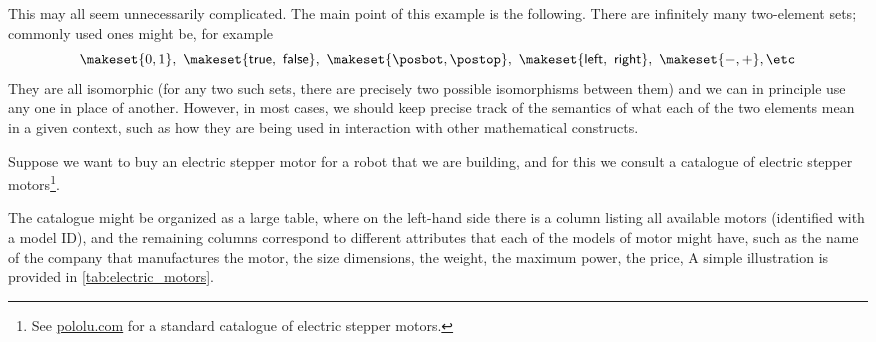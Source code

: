 {\begin{example}
    This may all seem unnecessarily complicated.
    The main point of this example is the following.
    There are infinitely many two-element sets; commonly used ones might be, for example
    \begin{equation}
        \makeset{0, 1 }, \ \makeset{ \textsf{true}, \textsf{ false} }, \ \makeset{ \posbot, \postop }, \ \makeset{ \textsf{left}, \textsf{ right} }, \ \makeset{ -, + }, \text{\etc}
    \end{equation}
    They are all isomorphic (for any two such sets, there are precisely two possible isomorphisms between them) and we can in principle use any one in place of another.
    However, in most cases, we should keep precise track of the semantics of what each of the two elements mean in a given context, such as how they are being used in interaction with other mathematical constructs.
\end{example}


\begin{example}[Relabelling]
    Suppose we want to buy an electric stepper motor for a robot that we are building, and for this we consult a catalogue of electric stepper motors\footnote{See \href{https://www.pololu.com/category/87/stepper-motors}{pololu.com} for a standard catalogue of electric stepper motors.
    }.

    The catalogue might be organized as a large table, where on the left-hand side there is a column listing all available motors (identified with a model ID), and the remaining columns correspond to different attributes that each of the models of motor might have, such as the name of the company that manufactures the motor, the size dimensions, the weight, the maximum power, the price, \etc
    A simple illustration is provided in \cref{tab:electric_motors}.


\end{example}}
